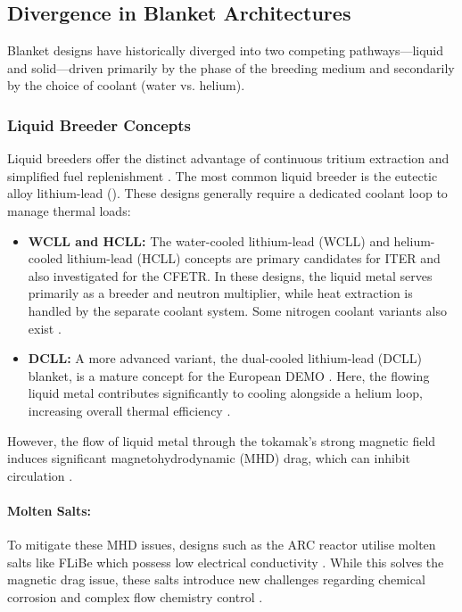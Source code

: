 \documentclass[12pt]{article}
\begin{document}
\subsection{Divergence in Blanket Architectures}
\label{sec:blanket_architectures_literature}
Blanket designs have historically diverged into two competing pathways—liquid and solid—driven
primarily by the phase of the breeding medium and secondarily by the choice of coolant (water vs.
helium).

\subsubsection{Liquid Breeder Concepts}
Liquid breeders offer the distinct advantage of continuous tritium extraction and simplified fuel
replenishment \cite{tas_liquid_1988}. The most common liquid breeder is the eutectic alloy
lithium-lead (). These designs generally require a dedicated coolant loop to manage
thermal loads:
\begin{itemize}
    \item \textbf{WCLL and HCLL:} The water-cooled lithium-lead (WCLL) \cite{federici_overview_2019}
    and helium-cooled lithium-lead (HCLL) \cite{wu_overview_2011, chen_conceptual_2015} concepts are
    primary candidates for ITER and also investigated for the CFETR. In these designs, the liquid
    metal serves primarily as a breeder and neutron multiplier, while heat extraction is handled by
    the separate coolant system. Some nitrogen coolant variants also exist
    \cite{fradera_pre-conceptual_2021}.
    \item \textbf{DCLL:} A more advanced variant, the dual-cooled lithium-lead (DCLL) blanket, is a
    mature concept for the European DEMO \cite{fernandez-berceruelo_progress_2024}. Here, the
    flowing liquid metal contributes significantly to cooling alongside a helium loop, increasing
    overall thermal efficiency \cite{graham_dual_2022}.
\end{itemize}

However, the flow of liquid metal through the tokamak's strong magnetic field induces significant
magnetohydrodynamic (MHD) drag, which can inhibit circulation
\cite{malang_self-cooled_1991,morley_thermofluid_2005}.

\paragraph{Molten Salts:} To mitigate these MHD issues, designs such as the ARC reactor utilise
molten salts like FLiBe  which possess low electrical conductivity
\cite{sorbom_arc_2015, segantin_optimisation_2020}. While this solves the magnetic drag issue, these
salts introduce new challenges regarding chemical corrosion and complex flow chemistry control
\cite{bocci_arc_2020, bohm_initial_2023}.
\end{document}
